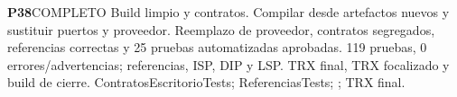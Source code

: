 \par\medskip\noindent\begin{minipage}{\linewidth}
\noindent\textbf{\large P38}\quad\textsf{COMPLETO}
 Build limpio y contratos.
 Compilar desde artefactos nuevos y sustituir puertos y proveedor.
 Reemplazo de proveedor, contratos segregados, referencias correctas y 25 pruebas automatizadas aprobadas.
 119 pruebas, 0 errores/advertencias; referencias, ISP, DIP y LSP.
 TRX final, TRX focalizado y build de cierre. ContratosEscritorioTests; ReferenciasTests; ; TRX final.
\end{minipage}\par


